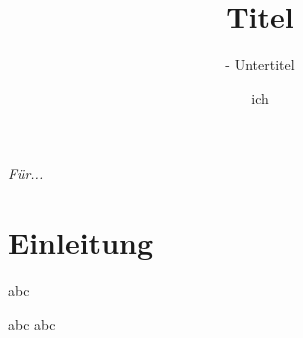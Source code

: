 \documentclass[12pt, 
 oneside,%
 a4paper,%
 openany, 
 numbers=noenddot, 
 listof=totoc,            %
 bibliography=totoc,            %
 index=totoc,            %
 captions=tableheading,   %
]{scrreprt}
\title{Titel}
\subtitle{- Untertitel}
\author{ich}
\begin{document}
 
\maketitle 
\clearpage 
\vspace*{\fill} 
{\hfill\sffamily\itshape Für...} 


\rmfamily 
\normalfont 

%  
% 
\tableofcontents 

\listoffigures 


\listoftables 
\newpage 
{} 
\mainmatter 
\chapter{Einleitung} 


 abc 

\newpage 
 abc 
\newpage 
 abc 
\end{document}
